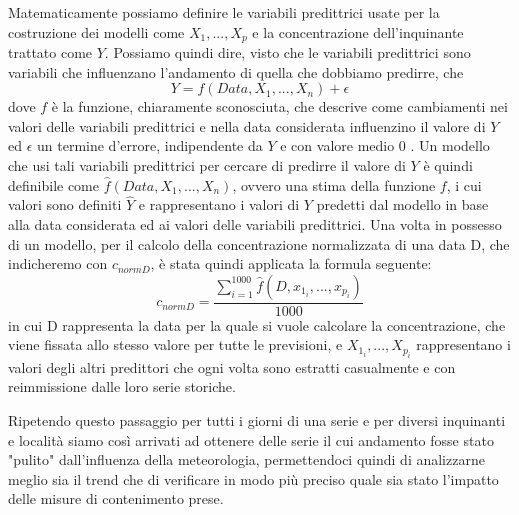 Matematicamente possiamo definire le variabili predittrici usate per la costruzione dei modelli come $X_1,...,X_p$ e la concentrazione dell'inquinante trattato come $Y$. Possiamo quindi dire, visto che le variabili predittrici sono variabili che influenzano l'andamento di quella che dobbiamo predirre, che 
\begin{equation}
Y = f(Data, X_1,...,X_n) + \epsilon
\end{equation}
dove $f$ è la funzione, chiaramente sconosciuta, che descrive come cambiamenti nei valori delle variabili predittrici e nella data considerata influenzino il valore di $Y$ ed $\epsilon$ un termine d'errore, indipendente da $Y$ e con valore medio 0 \cite{james2013introduction}. Un modello che usi tali variabili predittrici per cercare di predirre il valore di $Y$ è quindi definibile come $\hat{f}(Data, X_1,...,X_n)$, ovvero una stima della funzione $f$, i cui valori sono definiti $\hat{Y}$ e rappresentano i valori di $Y$ predetti dal modello in base alla data considerata ed ai valori delle variabili predittrici.    
Una volta in possesso di un modello, per il calcolo della concentrazione normalizzata di una data D, che indicheremo con $c_{norm D}$, è stata quindi applicata la formula seguente:
\begin{equation}
c_{norm D} = \frac{\sum_{i=1}^{1000} \hat{f}(D, x_{1_i},...,x_{p_i})}{1000}
\end{equation}
in cui D rappresenta la data per la quale si vuole calcolare la concentrazione, che viene fissata allo stesso valore per tutte le previsioni, e $X_{1_i},...,X_{p_i}$ rappresentano i valori degli altri predittori che ogni volta sono estratti casualmente e con reimmissione dalle loro serie storiche.

Ripetendo questo passaggio per tutti i giorni di una serie e per diversi inquinanti e località siamo così arrivati ad ottenere delle serie il cui andamento fosse stato "pulito" dall'influenza della meteorologia, permettendoci quindi di analizzarne meglio sia il trend che di verificare in modo più preciso quale sia stato l'impatto delle misure di contenimento prese.  

